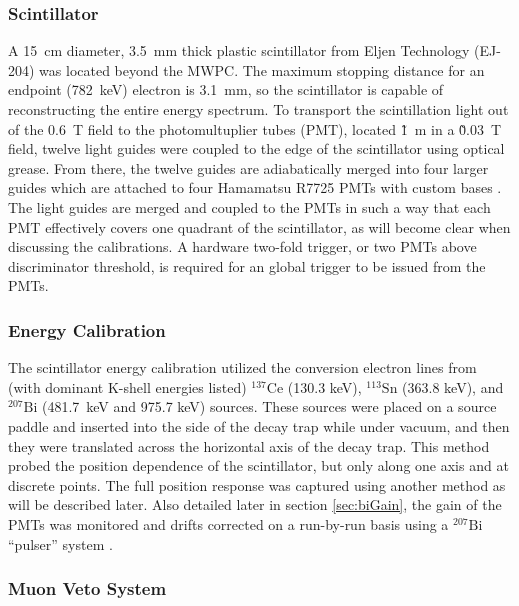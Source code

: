 \subsubsection{Scintillator}

A 15~cm diameter, 3.5~mm thick plastic scintillator \cite{plaster2012}
from Eljen Technology (EJ-204) was located beyond the
MWPC. The maximum stopping distance for an endpoint (782~keV) electron is 3.1~mm, so the
scintillator is capable of reconstructing the entire energy spectrum. To transport the
scintillation light out of the 0.6~T field to the photomultuplier tubes (PMT),
located \~1~m in a \~0.03~T field,
twelve light guides were coupled to the edge of the scintillator using optical grease.
From there, the twelve guides are adiabatically merged into four
larger guides which are attached to four Hamamatsu R7725 PMTs with custom bases \cite{hickerson2013}.
The light guides are merged and coupled to the PMTs in such a way that each PMT effectively
covers one quadrant of the scintillator, as will become clear when discussing the calibrations.
A hardware two-fold trigger, or two PMTs above discriminator threshold, is required for an
global trigger to be issued from the PMTs.

\subsubsection{Energy Calibration}

The scintillator energy calibration utilized the conversion electron lines from
(with dominant K-shell energies listed) $^{137}\mathrm{Ce}$
(130.3 keV), $^{113}\mathrm{Sn}$ (363.8 keV), and $^{207}\mathrm{Bi}$ (481.7~keV and 975.7 keV)
sources. These sources were placed on a source paddle and inserted into the side of the
decay trap while under vacuum, and then they were translated across the horizontal axis of the decay
trap. This method probed the position dependence of the scintillator, but only along one axis and
at discrete points. The full position response was captured using another method as will be
described later. Also detailed later in section \ref{sec:biGain}, the gain of the PMTs was monitored
and drifts corrected 
on a run-by-run basis using a $^{207}\mathrm{Bi}$ ``pulser'' system \cite{morris1976stable}.

\subsubsection{Muon Veto System}

